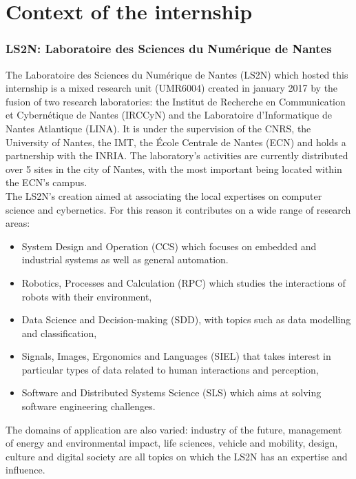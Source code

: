 \documentclass[12pt,times,onecolumn]{article}
\begin{document}
\clearpage
\tableofcontents
\clearpage
\listoffigures
\listoftables
\clearpage



\part{Context of the internship}
\section{LS2N: Laboratoire des Sciences du Num\'erique de Nantes}
The Laboratoire des Sciences du Num\'erique de Nantes (LS2N) which hosted this internship is a mixed research unit (UMR6004) created in january 2017 by the fusion of two research laboratories: the Institut de Recherche en Communication et Cybern\'etique de Nantes (IRCCyN) and the Laboratoire d'Informatique de Nantes Atlantique (LINA). It is under the supervision of the CNRS, the University of Nantes, the IMT, the \'Ecole Centrale de Nantes (ECN) and holds a partnership with the INRIA. The laboratory's activities are currently distributed over 5 sites in the city of Nantes, with the most important being located within the ECN's campus.\\

The LS2N's creation aimed at associating the local expertises on computer science and cybernetics. For this reason it contributes on a wide range of research areas:
\begin{itemize}
\item System Design and Operation (CCS) which focuses on embedded and industrial systems as well as general automation.
\item Robotics, Processes and Calculation (RPC) which studies the interactions of robots with their environment,
\item Data Science and Decision-making (SDD), with topics such as data modelling and classification,
\item Signals, Images, Ergonomics and Languages (SIEL) that takes interest in particular types of data related to human interactions and perception,
\item Software and Distributed Systems Science (SLS) which aims at solving software engineering challenges.
\end{itemize}
The domains of application are also varied: industry of the future, management of energy and environmental impact, life sciences, vehicle and mobility, design, culture and digital society are all topics on which the LS2N has an expertise and influence.\\
\end{document}
